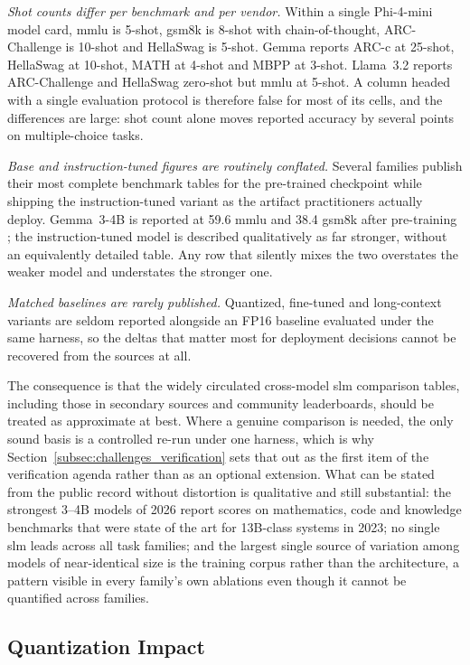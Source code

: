 \emph{Shot counts differ per benchmark and per vendor.} Within a single Phi-4-mini
model card, \gls{mmlu} is 5-shot, \gls{gsm8k} is 8-shot with chain-of-thought,
ARC-Challenge is 10-shot and HellaSwag is 5-shot. Gemma reports ARC-c at 25-shot,
HellaSwag at 10-shot, MATH at 4-shot and MBPP at 3-shot. Llama~3.2 reports
ARC-Challenge and HellaSwag zero-shot but \gls{mmlu} at 5-shot. A column headed
with a single evaluation protocol is therefore false for most of its cells, and
the differences are large: shot count alone moves reported accuracy by several
points on multiple-choice tasks.

\emph{Base and instruction-tuned figures are routinely conflated.} Several
families publish their most complete benchmark tables for the pre-trained
checkpoint while shipping the instruction-tuned variant as the artifact
practitioners actually deploy. Gemma~3-4B is reported at 59.6 \gls{mmlu} and 38.4
\gls{gsm8k} after pre-training \citep{team2025gemma3}; the instruction-tuned model
is described qualitatively as far stronger, without an equivalently detailed
table. Any row that silently mixes the two overstates the weaker model and
understates the stronger one.

\emph{Matched baselines are rarely published.} Quantized, fine-tuned and
long-context variants are seldom reported alongside an FP16 baseline evaluated
under the same harness, so the deltas that matter most for deployment decisions
cannot be recovered from the sources at all.

The consequence is that the widely circulated cross-model \gls{slm} comparison
tables, including those in secondary sources and community leaderboards, should
be treated as approximate at best. Where a genuine comparison is needed, the only
sound basis is a controlled re-run under one harness, which is why
Section~\ref{subsec:challenges_verification} sets that out as the first item of
the verification agenda rather than as an optional extension. What can be stated
from the public record without distortion is qualitative and still substantial:
the strongest 3--4B models of 2026 report scores on mathematics, code and
knowledge benchmarks that were state of the art for 13B-class systems in 2023;
no single \gls{slm} leads across all task families; and the largest single source
of variation among models of near-identical size is the training corpus rather
than the architecture, a pattern visible in every family's own ablations even
though it cannot be quantified across families.

\subsection{Quantization Impact}
\label{subsec:reported_quantization}

